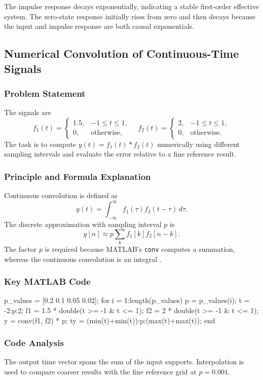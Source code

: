 \documentclass[11pt,a4paper]{article}
\begin{document}
The impulse response decays exponentially, indicating a stable first-order effective system. The zero-state response initially rises from zero and then decays because the input and impulse response are both causal exponentials.

\subsection{Numerical Convolution of Continuous-Time Signals}

\subsubsection{Problem Statement}
The signals are
\[
f_1(t)=
\begin{cases}
1.5, & -1\leq t\leq 1,\\
0, & \text{otherwise},
\end{cases}
\quad
f_2(t)=
\begin{cases}
2, & -1\leq t\leq 1,\\
0, & \text{otherwise}.
\end{cases}
\]
The task is to compute \(y(t)=f_1(t)*f_2(t)\) numerically using different sampling intervals and evaluate the error relative to a fine reference result.

\subsubsection{Principle and Formula Explanation}
Continuous convolution is defined as
\[
y(t)=\int_{-\infty}^{\infty}f_1(\tau)f_2(t-\tau)\,d\tau.
\]
The discrete approximation with sampling interval \(p\) is
\[
y[n]\approx p\sum_k f_1[k]f_2[n-k].
\]
The factor \(p\) is required because MATLAB's \texttt{conv} computes a summation, whereas the continuous convolution is an integral \cite{mathworksConv}.

\subsubsection{Key MATLAB Code}
\begin{matlabcode}
p_values = [0.2 0.1 0.05 0.02];
for i = 1:length(p_values)
    p = p_values(i);
    t = -2:p:2;
    f1 = 1.5 * double(t >= -1 & t <= 1);
    f2 = 2 * double(t >= -1 & t <= 1);
    y = conv(f1, f2) * p;
    ty = (min(t)+min(t)):p:(max(t)+max(t));
end
\end{matlabcode}

\subsubsection{Code Analysis}
The output time vector spans the sum of the input supports. Interpolation is used to compare coarser results with the fine reference grid at \(p=0.001\).
\end{document}
